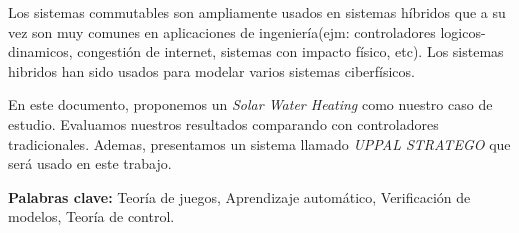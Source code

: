 \begin{resumen}

Los sistemas commutables son ampliamente usados en sistemas híbridos que a su vez son muy comunes en aplicaciones de ingeniería(ejm: controladores logicos-dinamicos, congestión 
de internet, sistemas con impacto físico, etc). Los sistemas hibridos han sido usados para modelar varios sistemas ciberfísicos.


En este documento, proponemos un \emph{Solar Water Heating} como nuestro caso de estudio. Evaluamos nuestros resultados comparando con controladores tradicionales. Ademas, presentamos un sistema llamado \emph{UPPAL STRATEGO} que será usado en este trabajo. 


\begin{flushleft}
\textbf{Palabras clave:} Teoría de juegos, Aprendizaje automático, Verificación de modelos, Teoría de control.
\end{flushleft}

\end{resumen}
